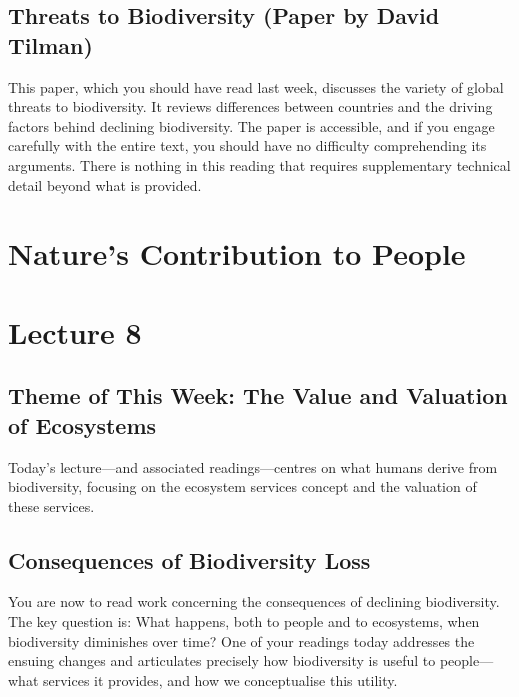 \documentclass[
  11pt,
]{book}
\begin{document}
\section{Threats to Biodiversity (Paper by David
Tilman)}\label{threats-to-biodiversity-paper-by-david-tilman}

This paper, which you should have read last week, discusses the variety
of global threats to biodiversity. It reviews differences between
countries and the driving factors behind declining biodiversity. The
paper is accessible, and if you engage carefully with the entire text,
you should have no difficulty comprehending its arguments. There is
nothing in this reading that requires supplementary technical detail
beyond what is provided.

\chapter{Nature's Contribution to
People}\label{natures-contribution-to-people}

\chapter*{Lecture 8}\label{lecture-8}

\section{Theme of This Week: The Value and Valuation of
Ecosystems}\label{theme-of-this-week-the-value-and-valuation-of-ecosystems}

Today's lecture---and associated readings---centres on what humans
derive from biodiversity, focusing on the ecosystem services concept and
the valuation of these services.

\section{Consequences of Biodiversity
Loss}\label{consequences-of-biodiversity-loss}

You are now to read work concerning the consequences of declining
biodiversity. The key question is: What happens, both to people and to
ecosystems, when biodiversity diminishes over time? One of your readings
today addresses the ensuing changes and articulates precisely how
biodiversity is useful to people---what services it provides, and how we
conceptualise this utility.
\end{document}
